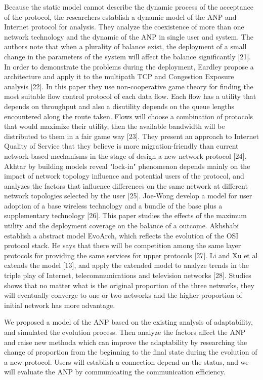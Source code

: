 \documentclass{article}
\begin{document}
Because the static model cannot describe the dynamic process of the acceptance of the protocol, the researchers establish
a dynamic model of the ANP and Internet protocol for analysis. They analyze the coexistence of more than one network
technology and the dynamic of the ANP in single user and system. The authors note that when a plurality of balance
exist, the deployment of a small change in the parameters of the system will affect the balance significantly [21].
In order to demonstrate the problems during the deployment, Eardley propose a architecture and apply it to the multipath
TCP and Congestion Exposure analysis [22]. In this paper they use non-cooperative game theory for finding the most
suitable flow control protocol of each data flow. Each flow has a utility that depends on throughput and also a
disutility depends on the queue lengths encountered along the route taken. Flows will choose a combination of protocols
that would maximize their utility, then the available bandwidth will be distributed to them in a fair game way [23].
They present an approach to Internet Quality of Service that they believe is more migration-friendly than current
network-based mechanisms in the stage of design a new network protocol [24]. Akhtar by building models reveal "lock-in"
phenomenon depends mainly on the impact of network topology influence and potential users of the protocol, and analyzes
the factors that influence differences on the same network at different network topologies selected by the user [25].
Joe-Wong develop a model for user adoption of a base wireless technology and a bundle of the base plus a supplementary
technology [26]. This paper studies the effects of the maximum utility and the deployment coverage on the balance of a
outcome. Akhshabi establish a abstract model EvoArch, which reflects the evolution of the OSI protocol stack. He says
that there will be competition among the same layer protocols for providing the same services for upper protocols [27].
Li and Xu et al extends the model [13], and apply the extended model to analyze trends in the triple play of Internet,
telecommunications and television networks [28]. Studies shows that no matter what is the original proportion of the
three networks, they will eventually converge to one or two networks and the higher proportion of initial network
has more advantage.

We proposed a model of the ANP based on the existing analysis of adaptability, and simulated the evolution process.
Then analyze the factors affect the ANP and raise new methoda which can improve the adaptability by researching
the change of proportion from the beginning to the final state during the evolution of a new protocol. Users will
establish a connection depend on the status, and we will evaluate the ANP by communicating the communication efficiency.
\end{document}
